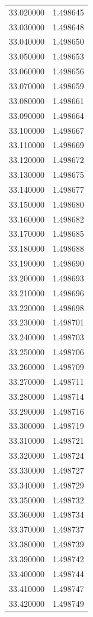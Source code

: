 \begin{tabular}{rr}
33.020000 & 1.498645 \\
33.030000 & 1.498648 \\
33.040000 & 1.498650 \\
33.050000 & 1.498653 \\
33.060000 & 1.498656 \\
33.070000 & 1.498659 \\
33.080000 & 1.498661 \\
33.090000 & 1.498664 \\
33.100000 & 1.498667 \\
33.110000 & 1.498669 \\
33.120000 & 1.498672 \\
33.130000 & 1.498675 \\
33.140000 & 1.498677 \\
33.150000 & 1.498680 \\
33.160000 & 1.498682 \\
33.170000 & 1.498685 \\
33.180000 & 1.498688 \\
33.190000 & 1.498690 \\
33.200000 & 1.498693 \\
33.210000 & 1.498696 \\
33.220000 & 1.498698 \\
33.230000 & 1.498701 \\
33.240000 & 1.498703 \\
33.250000 & 1.498706 \\
33.260000 & 1.498709 \\
33.270000 & 1.498711 \\
33.280000 & 1.498714 \\
33.290000 & 1.498716 \\
33.300000 & 1.498719 \\
33.310000 & 1.498721 \\
33.320000 & 1.498724 \\
33.330000 & 1.498727 \\
33.340000 & 1.498729 \\
33.350000 & 1.498732 \\
33.360000 & 1.498734 \\
33.370000 & 1.498737 \\
33.380000 & 1.498739 \\
33.390000 & 1.498742 \\
33.400000 & 1.498744 \\
33.410000 & 1.498747 \\
33.420000 & 1.498749 \\

\end{tabular}
